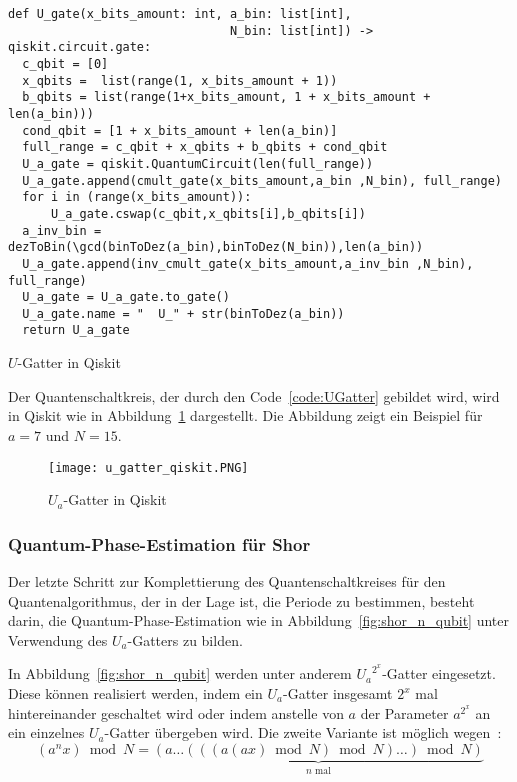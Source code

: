 \begin{listing}[H]
\begin{verbatim}  
def U_gate(x_bits_amount: int, a_bin: list[int],
                               N_bin: list[int]) -> qiskit.circuit.gate:  
  c_qbit = [0]
  x_qbits =  list(range(1, x_bits_amount + 1))
  b_qbits = list(range(1+x_bits_amount, 1 + x_bits_amount + len(a_bin)))
  cond_qbit = [1 + x_bits_amount + len(a_bin)]
  full_range = c_qbit + x_qbits + b_qbits + cond_qbit
  U_a_gate = qiskit.QuantumCircuit(len(full_range))
  U_a_gate.append(cmult_gate(x_bits_amount,a_bin ,N_bin), full_range)
  for i in (range(x_bits_amount)):
      U_a_gate.cswap(c_qbit,x_qbits[i],b_qbits[i])
  a_inv_bin = dezToBin(\gcd(binToDez(a_bin),binToDez(N_bin)),len(a_bin))
  U_a_gate.append(inv_cmult_gate(x_bits_amount,a_inv_bin ,N_bin), full_range)
  U_a_gate = U_a_gate.to_gate()
  U_a_gate.name = "  U_" + str(binToDez(a_bin))
  return U_a_gate
  \end{verbatim}
  \caption{\(U\)-Gatter in Qiskit}
  \label{code:UGatter}
\end{listing}

Der Quantenschaltkreis, der durch den Code~\ref{code:UGatter} gebildet wird, 
wird in Qiskit wie in Abbildung~\ref{fig:u_gatter_qiskit} dargestellt. 
Die Abbildung zeigt ein Beispiel für \(a=7\) und \(N=15\).

\begin{figure}[H]
  \centering
  \texttt{[image: u\_gatter\_qiskit.PNG]}
  \caption{\(U_a\)-Gatter in Qiskit}
  \label{fig:u_gatter_qiskit}
\end{figure}

\subsubsection{Quantum-Phase-Estimation für Shor} \label{section:imp_QPE_Shor}
Der letzte Schritt zur Komplettierung des Quantenschaltkreises für den Quantenalgorithmus, 
der in der Lage ist, 
die Periode zu bestimmen, besteht darin, 
die Quantum-Phase-Estimation wie in Abbildung~\ref{fig:shor_n_qubit} unter Verwendung des \(U_a\)-Gatters zu bilden.

In Abbildung~\ref{fig:shor_n_qubit} werden unter anderem \({U_a}^{2^x}\)-Gatter eingesetzt.
Diese können realisiert werden, 
indem ein \({U_a}\)-Gatter insgesamt \(2^x\) mal hintereinander geschaltet wird oder 
indem anstelle von \(a\) der Parameter \(a^{2^x}\) an ein einzelnes \(U_a\)-Gatter übergeben wird.
Die zweite Variante ist möglich wegen~\cite{beauregard2003circuit}:
\[(a^nx)\bmod N = \underbrace{(a\dotsc(((a(ax)\bmod N)\bmod N)\dotsc)\bmod N)}_{\text{\(n\) mal}}\]


